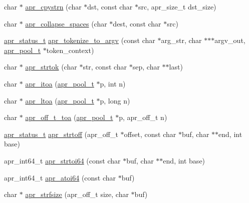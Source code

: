 \begin{DoxyCompactItemize}
\item 
char $\ast$ \hyperlink{group__apr__strings_ga69700a825e82dd646f9f166599040431}{apr\-\_\-cpystrn} (char $\ast$dst, const char $\ast$src, apr\-\_\-size\-\_\-t dst\-\_\-size)
\item 
char $\ast$ \hyperlink{group__apr__strings_gafd92441a5f4fa3b5f5aa49e1f9884bc7}{apr\-\_\-collapse\-\_\-spaces} (char $\ast$dest, const char $\ast$src)
\item 
\hyperlink{group__apr__errno_gaf76ee4543247e9fb3f3546203e590a6c}{apr\-\_\-status\-\_\-t} \hyperlink{group__apr__strings_ga5213cee7e8ba799df9dc2e57f71cd4dd}{apr\-\_\-tokenize\-\_\-to\-\_\-argv} (const char $\ast$arg\-\_\-str, char $\ast$$\ast$$\ast$argv\-\_\-out, \hyperlink{group__apr__pools_gaf137f28edcf9a086cd6bc36c20d7cdfb}{apr\-\_\-pool\-\_\-t} $\ast$token\-\_\-context)
\item 
char $\ast$ \hyperlink{group__apr__strings_ga1cf7fcb5843707ece733e27aad85c516}{apr\-\_\-strtok} (char $\ast$str, const char $\ast$sep, char $\ast$$\ast$last)
\item 
char $\ast$ \hyperlink{group__apr__strings_gae1c780f2d908a286a141e4b885254a9c}{apr\-\_\-itoa} (\hyperlink{group__apr__pools_gaf137f28edcf9a086cd6bc36c20d7cdfb}{apr\-\_\-pool\-\_\-t} $\ast$p, int n)
\item 
char $\ast$ \hyperlink{group__apr__strings_ga578ea3fa78957c6b2e9b8ab4cbfd60b1}{apr\-\_\-ltoa} (\hyperlink{group__apr__pools_gaf137f28edcf9a086cd6bc36c20d7cdfb}{apr\-\_\-pool\-\_\-t} $\ast$p, long n)
\item 
char $\ast$ \hyperlink{group__apr__strings_gabce9fb74bbad08d795389bfe859053d3}{apr\-\_\-off\-\_\-t\-\_\-toa} (\hyperlink{group__apr__pools_gaf137f28edcf9a086cd6bc36c20d7cdfb}{apr\-\_\-pool\-\_\-t} $\ast$p, apr\-\_\-off\-\_\-t n)
\item 
\hyperlink{group__apr__errno_gaf76ee4543247e9fb3f3546203e590a6c}{apr\-\_\-status\-\_\-t} \hyperlink{group__apr__strings_ga1583688e0777398174f62e46a522ae8f}{apr\-\_\-strtoff} (apr\-\_\-off\-\_\-t $\ast$offset, const char $\ast$buf, char $\ast$$\ast$end, int base)
\item 
apr\-\_\-int64\-\_\-t \hyperlink{group__apr__strings_ga1da34829609e8976f498b235afd6cbe4}{apr\-\_\-strtoi64} (const char $\ast$buf, char $\ast$$\ast$end, int base)
\item 
apr\-\_\-int64\-\_\-t \hyperlink{group__apr__strings_gaf0653577ee64efb5406d932db95cce3d}{apr\-\_\-atoi64} (const char $\ast$buf)
\item 
char $\ast$ \hyperlink{group__apr__strings_gaf66522fda6d2dfa540fdc58831405980}{apr\-\_\-strfsize} (apr\-\_\-off\-\_\-t size, char $\ast$buf)
\end{DoxyCompactItemize}



